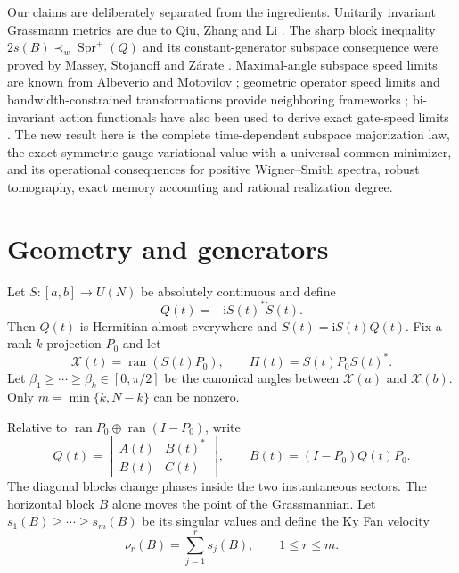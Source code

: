 \documentclass[11pt]{article}
\theoremstyle{definition}
\theoremstyle{remark}
\newcommand{\ran}{\operatorname{ran}}
\newcommand{\Spr}{\operatorname{Spr}^{+}}
\begin{document}
Our claims are deliberately separated from the ingredients.  Unitarily
invariant Grassmann metrics are due to Qiu, Zhang and Li
\cite{QiuZhangLi2005}.  The sharp block inequality
$2s(B)\prec_w\Spr(Q)$ and its constant-generator subspace consequence were
proved by Massey, Stojanoff and Z{\'a}rate
\cite{MasseyStojanoffZarate2021}.  Maximal-angle subspace speed limits are
known from Albeverio and Motovilov
\cite{AlbeverioMotovilov2022a,AlbeverioMotovilov2022b}; geometric operator
speed limits and bandwidth-constrained transformations provide neighboring
frameworks \cite{AllanHornedalAndersson2021,CarabbaEtAl2022,HornedalEtAl2023};
bi-invariant action functionals have also been used to derive exact gate-speed
limits \cite{RussellStepney2017}.  The new result here is the complete
time-dependent subspace majorization law, the exact symmetric-gauge
variational value with a universal common minimizer, and its operational
consequences for positive Wigner--Smith spectra, robust tomography, exact
memory accounting and rational realization degree.

\section{Geometry and generators}

Let $S:[a,b]\to U(N)$ be absolutely continuous and define
\begin{equation}\label{eq:generator}
 Q(t)=-\mathrm iS(t)^*\dot S(t).
\end{equation}
Then $Q(t)$ is Hermitian almost everywhere and
$\dot S(t)=\mathrm iS(t)Q(t)$.  Fix a rank-$k$ projection $P_0$ and let
\begin{equation}
 \mathcal X(t)=\ran(S(t)P_0),\qquad
 \Pi(t)=S(t)P_0S(t)^*.
\end{equation}
Let $\beta_1\geq\cdots\geq\beta_k\in[0,\pi/2]$ be the canonical angles
between $\mathcal X(a)$ and $\mathcal X(b)$.  Only
$m=\min\{k,N-k\}$ can be nonzero.

Relative to $\ran P_0\oplus\ran(I-P_0)$, write
\begin{equation}\label{eq:blockQ}
 Q(t)=\begin{bmatrix}A(t)&B(t)^*\\B(t)&C(t)\end{bmatrix},
 \qquad B(t)=(I-P_0)Q(t)P_0.
\end{equation}
The diagonal blocks change phases inside the two instantaneous sectors.  The
horizontal block $B$ alone moves the point of the Grassmannian.  Let
$s_1(B)\geq\cdots\geq s_m(B)$ be its singular values and define the Ky Fan
velocity
\begin{equation}
 \nu_r(B)=\sum_{j=1}^r s_j(B),\qquad 1\leq r\leq m.
\end{equation}
\end{document}
